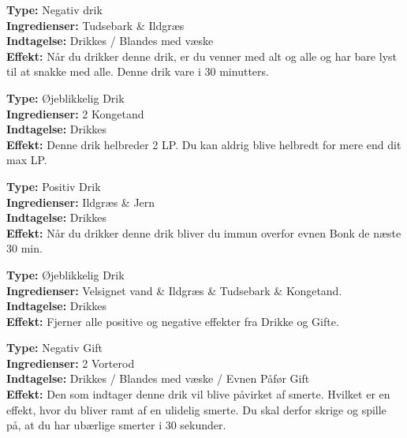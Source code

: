 \begin{gift*}
\textbf{Type:} Negativ drik\\
\textbf{Ingredienser:} Tudsebark \& Ildgræs\\
\textbf{Indtagelse:} Drikkes / Blandes med væske\\
\textbf{Effekt:} Når du drikker denne drik, er du venner med alt og alle og har bare lyst til at snakke med alle. Denne drik vare i 30 minutters.
\end{gift*}

\begin{drik*}[Helbredelsesdrik]
\textbf{Type:} Øjeblikkelig Drik\\
\textbf{Ingredienser:} 2 Kongetand\\
\textbf{Indtagelse:} Drikkes\\
\textbf{Effekt:} Denne drik helbreder 2 LP. Du kan aldrig blive helbredt for mere end dit max LP.\\
\end{drik*}

\begin{drik*}[Kranieforstærker]
\textbf{Type:} Positiv Drik\\
\textbf{Ingredienser:} Ildgræs \& Jern\\
\textbf{Indtagelse:} Drikkes\\
\textbf{Effekt:} Når du drikker denne drik bliver du immun overfor evnen Bonk de næste 30 min.\\
\end{drik*}

\begin{drik*}
\textbf{Type:} Øjeblikkelig Drik\\
\textbf{Ingredienser:} Velsignet vand \& Ildgræs \& Tudsebark \& Kongetand.\\
\textbf{Indtagelse:} Drikkes\\
\textbf{Effekt:} Fjerner alle positive og negative effekter fra Drikke og Gifte.
\end{drik*}

\begin{gift*}[Smertedrik]
\textbf{Type:} Negativ Gift\\
\textbf{Ingredienser:} 2 Vorterod\\
\textbf{Indtagelse:} Drikkes / Blandes med væske / Evnen Påfør Gift\\
\textbf{Effekt:} Den som indtager denne drik vil blive påvirket af smerte. Hvilket er en effekt, hvor du bliver ramt af en ulidelig smerte. Du skal derfor skrige og spille på, at du har ubærlige smerter i 30 sekunder.\\
\end{gift*}

